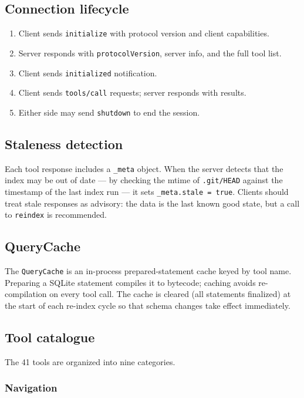 \subsection{Connection lifecycle}

\begin{enumerate}
  \item Client sends \texttt{initialize} with protocol version and
        client capabilities.
  \item Server responds with \texttt{protocolVersion}, server info, and the
        full tool list.
  \item Client sends \texttt{initialized} notification.
  \item Client sends \texttt{tools/call} requests; server responds with results.
  \item Either side may send \texttt{shutdown} to end the session.
\end{enumerate}

\subsection{Staleness detection}

Each tool response includes a \texttt{\_meta} object. When the server detects
that the index may be out of date --- by checking the mtime of
\texttt{.git/HEAD} against the timestamp of the last index run --- it sets
\texttt{\_meta.stale = true}. Clients should treat stale responses as advisory:
the data is the last known good state, but a call to \texttt{reindex} is
recommended.

\subsection{QueryCache}
\label{sec:querycache}

The \texttt{QueryCache} is an in-process prepared-statement cache keyed by
tool name. Preparing a SQLite statement compiles it to bytecode; caching avoids
re-compilation on every tool call. The cache is cleared (all statements
finalized) at the start of each re-index cycle so that schema changes take
effect immediately.

\subsection{Tool catalogue}

The 41 tools are organized into nine categories.

\subsubsection{Navigation}

